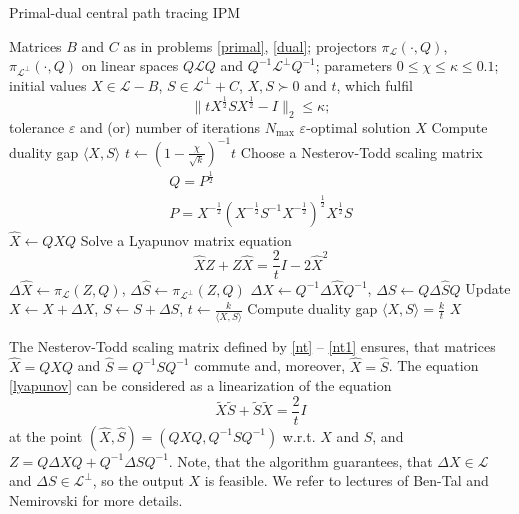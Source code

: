 \documentclass[12pt]{article}
\begin{document}
\begin{algorithm}[H]
	\caption{Primal-dual central path tracing IPM}
	\label{ipm}
	\begin{algorithmic}[1]
		\Require Matrices $B$ and $C$ as in problems \ref{primal}, \ref{dual};
		projectors $\pi_{\mathcal L}(\cdot, Q)$, $\pi_{\mathcal L^\perp}(\cdot, Q)$ on 
		linear spaces $Q \mathcal L Q$ and $Q^{-1} \mathcal L^\perp Q^{-1}$;
		parameters $0 \leq \chi \leq \kappa \leq 0.1$;
		initial values $X \in \mathcal L - B$, $S \in \mathcal L^\perp + C$, $X, S \succ 
		0$ 
		and $t$, which fulfil
		\[	
			\| t X^{\frac12} S X^{\frac12} - I \|_2 \leq \kappa;
		\]
		tolerance $\varepsilon$ and (or) number of iterations $N_{\max}$
		\Ensure $\varepsilon$-optimal solution $X$
		\State Compute duality gap $\langle X, S \rangle$
			\State $t \gets \left( 1 - \frac\chi{\sqrt{k}} \right)^{-1} t$
			\State Choose a Nesterov-Todd scaling matrix
			\begin{gather}
			\label{nt}
				 Q = P^\frac12 \\
			\label{nt1}
				 P = X^{-\frac12} \left( X^{-\frac12} S^{-1} X^{-\frac12} \right)^\frac12 
				 X^\frac12 S
			\end{gather}
			\State $\hat X \gets Q X Q$
			\State Solve a Lyapunov matrix equation
			\begin{equation}
			\label{lyapunov}
				\hat X Z + Z \hat X = \frac2t I - 2 \hat X^2
			\end{equation}
			\State $\Delta \hat X \gets \pi_{\mathcal L}(Z, Q)$, $\Delta \hat S \gets 
			\pi_{\mathcal 
			L^\perp}(Z, Q)$
			\State $\Delta X \gets Q^{-1} \Delta \hat X Q^{-1}$, $\Delta S \gets Q 
			\Delta\hat S Q$
			\State Update $X \gets X + \Delta X$, $S \gets S + \Delta S$, $t \gets \frac 
			k{\langle X, S \rangle}$
			\State Compute duality gap $\langle X, S \rangle = \frac kt$ 
		\EndWhile
		 $X$
	\end{algorithmic}
\end{algorithm}
The Nesterov-Todd scaling matrix defined by \ref{nt} -- \ref{nt1} ensures, that matrices 
$\hat X = Q 
X Q$ and $\hat S = Q^{-1} S Q^{-1}$ commute and, moreover, $\hat X = \hat S$. 
The equation \ref{lyapunov} can be considered as a linearization of the equation
\[
	\tilde X \tilde S + \tilde S \tilde X = \frac2t I
\]
at the point $(\hat X, \hat S) = (QXQ, Q^{-1} S Q^{-1})$ w.r.t. $X$ and $S$, and $Z = Q 
\Delta X Q + Q^{-1} \Delta S Q^{-1}$.
Note, that the algorithm guarantees, that $\Delta X \in \mathcal L$ and $\Delta S \in 
\mathcal L^\perp$, so the output $X$ is feasible.
We refer to lectures of Ben-Tal and Nemirovski \cite{nemirovski} for more details.
\end{document}
